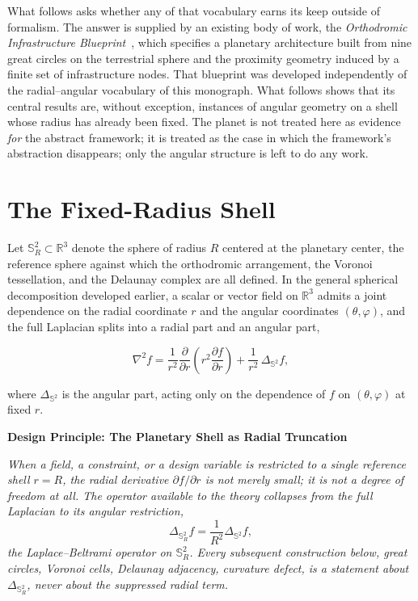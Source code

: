 \documentclass[11pt,fleqn]{book}
\numberwithin{equation}{chapter}
\newenvironment{principle}[1]
  {\begin{principleEnv}
   \noindent\textbf{Design Principle: #1}\par\smallskip\itshape}
  {\end{principleEnv}}
\theoremstyle{plain}
\theoremstyle{definition}
\theoremstyle{remark}
\newcommand{\Sphere}{\mathbb{S}^{2}}
\newcommand{\R}{\mathbb{R}}
\begin{document}
What follows asks whether any of that vocabulary earns its keep outside of formalism. The answer is supplied by an existing body of work, the \emph{Orthodromic Infrastructure Blueprint}~\cite{orthodromic}, which specifies a planetary architecture built from nine great circles on the terrestrial sphere and the proximity geometry induced by a finite set of infrastructure nodes. That blueprint was developed independently of the radial--angular vocabulary of this monograph. What follows shows that its central results are, without exception, instances of angular geometry on a shell whose radius has already been fixed. The planet is not treated here as evidence \emph{for} the abstract framework; it is treated as the case in which the framework's abstraction disappears; only the angular structure is left to do any work.

\section{The Fixed-Radius Shell}

Let \(\Sphere_R\subset\R^3\) denote the sphere of radius \(R\) centered at the planetary center, the reference sphere against which the orthodromic arrangement, the Voronoi tessellation, and the Delaunay complex are all defined. In the general spherical decomposition developed earlier, a scalar or vector field on \(\R^3\) admits a joint dependence on the radial coordinate \(r\) and the angular coordinates \((\theta,\varphi)\), and the full Laplacian splits into a radial part and an angular part,

\begin{equation}
\nabla^2 f
=
\frac{1}{r^2}\frac{\partial}{\partial r}
\left(r^2\frac{\partial f}{\partial r}\right)
+
\frac{1}{r^2}\,\Delta_{\Sphere}f,
\end{equation}

where \(\Delta_{\Sphere}\) is the angular part, acting only on the dependence of \(f\) on \((\theta,\varphi)\) at fixed \(r\).

\begin{principle}{The Planetary Shell as Radial Truncation}
When a field, a constraint, or a design variable is restricted to a single reference shell \(r=R\), the radial derivative \(\partial f/\partial r\) is not merely small; it is not a degree of freedom at all. The operator available to the theory collapses from the full Laplacian to its angular restriction,
\[
\Delta_{\Sphere_R}f
=
\frac{1}{R^2}\Delta_{\Sphere}f,
\]
the Laplace--Beltrami operator on \(\Sphere_R\). Every subsequent construction below, great circles, Voronoi cells, Delaunay adjacency, curvature defect, is a statement about \(\Delta_{\Sphere_R}\), never about the suppressed radial term.
\end{principle}
\end{document}
